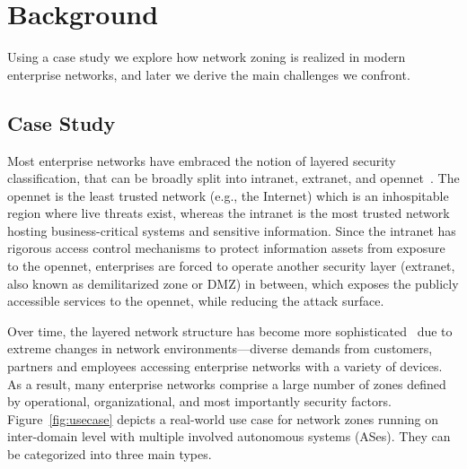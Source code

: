 \chapter{Background}
\label{background}


Using a case study we explore how network zoning is realized in modern enterprise networks, and later we derive the main challenges we confront.

\section{Case Study}
\label{sec:casestudy}

Most enterprise networks have embraced the notion of layered security classification,
that can be broadly split into intranet, extranet, and opennet~\cite{ramasamy2011towards}. 
The opennet is the least trusted network (e.g., the Internet) which is an inhospitable region 
where live threats exist, whereas the intranet is the most trusted network hosting 
business-critical systems and sensitive information. Since the intranet has rigorous access 
control mechanisms to protect information assets from exposure to the opennet, enterprises are 
forced to operate another security layer (extranet, also known as demilitarized zone or DMZ) in between, which exposes the publicly 
accessible services to the opennet, while reducing the attack surface. 

Over time, the layered network structure has become more sophisticated~\cite{obregon2015infrastructure}
due to extreme changes in network environments---diverse demands from customers, partners
and employees accessing enterprise networks with a variety of devices.
As a result, many enterprise networks 
comprise a large number of zones defined by operational, organizational, and most
importantly security factors. Figure~\ref{fig:usecase} depicts a real-world use case for 
network zones running on inter-domain level with multiple involved autonomous systems (ASes). They 
can be categorized into three main types. 

